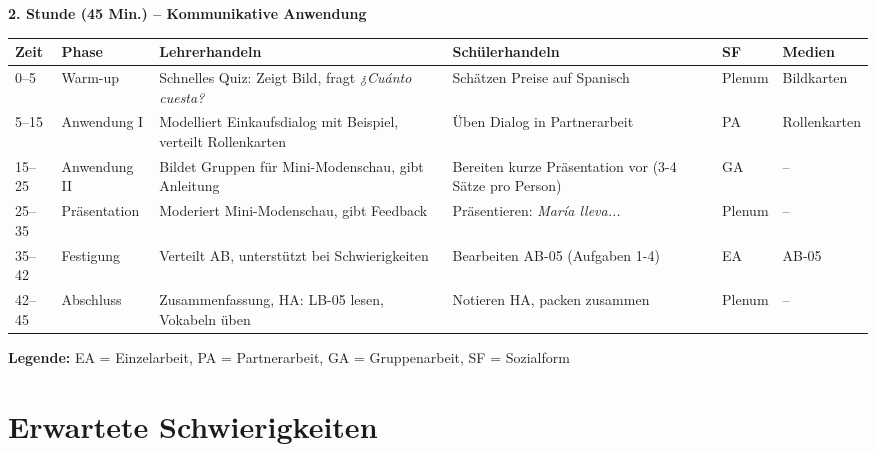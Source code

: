 \documentclass[11pt,a4paper]{article}
\begin{document}
\vspace{1em}

\textbf{2. Stunde (45 Min.) -- Kommunikative Anwendung}

\begin{longtable}{|p{1cm}|p{1.5cm}|p{4cm}|p{3cm}|p{2cm}|p{2cm}|}
\hline
\textbf{Zeit} & \textbf{Phase} & \textbf{Lehrerhandeln} & \textbf{Schülerhandeln} & \textbf{SF} & \textbf{Medien} \\
\hline
\endhead

0--5 & Warm-up & Schnelles Quiz: Zeigt Bild, fragt \textit{¿Cuánto cuesta?} & Schätzen Preise auf Spanisch & Plenum & Bildkarten \\
\hline

5--15 & Anwen\-dung I & Modelliert Einkaufsdialog mit Beispiel, verteilt Rollenkarten & Üben Dialog in Partnerarbeit & PA & Rollenkarten \\
\hline

15--25 & Anwen\-dung II & Bildet Gruppen für Mini-Modenschau, gibt Anleitung & Bereiten kurze Präsentation vor (3-4 Sätze pro Person) & GA & -- \\
\hline

25--35 & Präsen\-tation & Moderiert Mini-Modenschau, gibt Feedback & Präsentieren: \textit{María lleva...} & Plenum & -- \\
\hline

35--42 & Festigung & Verteilt AB, unterstützt bei Schwierigkeiten & Bearbeiten AB-05 (Aufgaben 1-4) & EA & AB-05 \\
\hline

42--45 & Abschluss & Zusammenfassung, HA: LB-05 lesen, Vokabeln üben & Notieren HA, packen zusammen & Plenum & -- \\
\hline
\end{longtable}

\textbf{Legende:} EA = Einzelarbeit, PA = Partnerarbeit, GA = Gruppenarbeit, SF = Sozialform

\section{Erwartete Schwierigkeiten}
\end{document}
